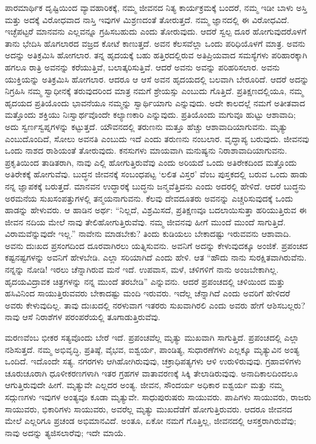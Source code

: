 ಪಾರಮಾರ್ಥಿಕ ದೃಷ್ಟಿಯಿಂದ ವ್ಯಾವಹಾರಿಕಕ್ಕೆ, ನಮ್ಮ ಜೀವನದ ನಿತ್ಯ ಕಾರ್ಯಕ್ರಮಕ್ಕೆ ಬಂದರೆ, ನಮ್ಮ ಇಡೀ ಬಾಳು ಅಸ್ತಿ ಮತ್ತು ಅದಕ್ಕೆ ವಿರೋಧವಾದ ನಾಸ್ತಿ ಇವುಗಳ ಮಿಶ್ರಣದಂತೆ ತೋರುತ್ತದೆ. ನಮ್ಮ ಜ್ಞಾನದಲ್ಲಿ ಈ ವಿರೋಧವಿದೆ. ಇಚ್ಛೆಪಟ್ಟರೆ ಮಾನವನು ಎಲ್ಲವನ್ನೂ ಗ್ರಹಿಸಬಹುದು ಎಂದು ತೋರುವುದು. ಆದರೆ ಸ್ವಲ್ಪ ದೂರ ಹೋಗುವುದರೊಳಗೆ ತಾನು ಭೇದಿಸಿ ಹೊಗಲಾರದ ವಜ್ರದ ಕೋಟೆ ಕಾಣುತ್ತದೆ. ಅವನ ಕೆಲಸವೆಲ್ಲಾ ಒಂದು ಪರಿಧಿಯೊಳಗೆ ಮಾತ್ರ. ಅವನು ಅದನ್ನು ಅತಿಕ್ರಮಿಸಿ ಹೋಗಲಾರ. ತನ್ನ ಹೃದಯಕ್ಕೆ ಬಹು ಹತ್ತಿರದಲ್ಲಿರುವ ಅತಿಪ್ರಿಯವಾದ ಸಮಸ್ಯೆಗಳು ಪರಿಹಾರಕ್ಕಾಗಿ ಹಗಲೂ ರಾತ್ರಿ ಅವನನ್ನು ಕರೆಯುತ್ತಿವೆ, ಬಲಾತ್ಕರಿಸುತ್ತಿವೆ. ಆದರೆ ಅವನು ಅವನ್ನು ಪರಿಹರಿಸಲಾರ. ಅವನು ಯುಕ್ತಿಯನ್ನು ಅತಿಕ್ರಮಿಸಿ ಹೋಗಲಾರ. ಆದರೂ ಆ ಆಸೆ ಅವನ ಹೃದಯದಲ್ಲಿ ಬಲವಾಗಿ ಬೇರೂರಿದೆ. ಆದರೆ ಅದನ್ನು ನಿಗ್ರಹಿಸಿ ನಮ್ಮ ಸ್ವಾಧೀನಕ್ಕೆ ತರುವುದರಿಂದ ಮಾತ್ರ ನಮಗೆ ಶ್ರೇಯಸ್ಸು ಎಂಬುದು ಗೊತ್ತಿದೆ. ಪ್ರತಿಕ್ಷಣದಲ್ಲಿಯೂ, ನಮ್ಮ ಹೃದಯದ ಪ್ರತಿಯೊಂದು ಭಾವನೆಯೂ ನಮ್ಮನ್ನು ಸ್ವಾರ್ಥಿಯಾಗು ಎನ್ನುವುದು. ಅದೇ ಕಾಲದಲ್ಲೆ ನಮಗೆ ಅತೀತವಾದ ಮತ್ತೊಂದು ಶಕ್ತಿಯು ನಿಃಸ್ವಾರ್ಥವೊಂದೇ ಕಲ್ಯಾಣಕಾರಿ ಎನ್ನುವುದು. ಪ್ರತಿಯೊಂದು ಮಗುವೂ ಹುಟ್ಟು ಆಶಾವಾದಿ; ಅದು ಸ್ವರ್ಣಸ್ವಪ್ನಗಳನ್ನು ಕಟ್ಟುತ್ತದೆ. ಯೌವನದಲ್ಲಿ ತರುಣನು ಮತ್ತೂ ಹೆಚ್ಚು ಆಶಾವಾದಿಯಾಗುವನು. ಮೃತ್ಯು ಎಂಬುದೊಂದಿದೆ, ಸೋಲು ಅವನತಿ ಎಂಬುದು ಇದೆ ಎಂದು ತರುಣನು ನಂಬಲಾರ. ವೃದ್ಧಾಪ್ಯ ಬರುವುದು. ಜೀವನವು ಒಂದು ನಾಶದ ರಾಶಿಯಂತೆ ತೋರುವುದು. ಕನಸುಗಳು ಮಾಯವಾಗಿ ಮನುಷ್ಯನು ನಿರಾಶಾವಾದಿಯಾಗುವನು. ಪ್ರಕೃತಿಯಿಂದ ತಾಡಿತರಾಗಿ, ನಾವು ಎಲ್ಲಿ ಹೋಗುತ್ತಿರುವೆವು ಎಂದು ಅರಿಯದೆ ಒಂದು ಅತಿರೇಕದಿಂದ ಮತ್ತೊಂದು ಅತಿರೇಕಕ್ಕೆ ಹೋಗುವೆವು. ಬುದ್ಧನ ಜೀವನಕ್ಕೆ ಸಂಬಂಧಪಟ್ಟ ‘ಲಲಿತ ವಿಸ್ತರ’ ವೆಂಬ ಪುಸ್ತಕದಲ್ಲಿ ಬರುವ ಒಂದು ಹಾಡು ನನ್ನ ಜ್ಞಾಪಕಕ್ಕೆ ಬರುತ್ತದೆ. ಮಾನವನ ಉದ್ಧಾರಕ್ಕೆ ಬುದ್ಧನು ಜನ್ಮವೆತ್ತಿದನು ಎಂದು ಅದರಲ್ಲಿ ಹೇಳಿದೆ. ಆದರೆ ಬುದ್ಧನು ಅರಮನೆಯ ಸುಖಸಂಪತ್ತುಗಳಲ್ಲಿ ತನ್ಮಯನಾಗುವನು. ಕೆಲವು ದೇವದೂತರು ಅವನನ್ನು ಎಚ್ಚರಿಸುವುದಕ್ಕೆ ಒಂದು ಹಾಡನ್ನು ಹೇಳುವರು. ಆ ಹಾಡಿನ ಅರ್ಥ: “ನಿಲ್ಲದೆ, ವಿಶ್ರಮಿಸದೆ, ಪ್ರತಿಕ್ಷಣವೂ ಬದಲಾಯಿಸುತ್ತಾ ಹರಿಯುತ್ತಿರುವ ಈ ಜೀವನ ನದಿಯ ಮೇಲೆ ನಾವು ತೇಲಿಹೋಗುತ್ತಿರುವೆವು. ನಮ್ಮ ಜೀವನವು ಹೀಗೆ ಮುಂದೆ ಮುಂದೆ ಸಾಗುತ್ತಿದೆ. ವಿರಾಮವೆನ್ನುವುದೇ ಇಲ್ಲ.” ನಾವೇನು ಮಾಡಬೇಕು? ತಿಂದು ಕುಡಿಯಲು ಬೇಕಾದಷ್ಟು ಇರುವವನು ಆಶಾವಾದಿ. ಅವನು ದುಃಖದ ಪ್ರಸಂಗದಿಂದ ದೂರವಾಗಿರಲು ಯತ್ನಿಸುವನು. ಅವನಿಗೆ ಅದನ್ನು ಕೇಳುವುದಕ್ಕೂ ಅಂಜಿಕೆ. ಪ್ರಪಂಚದ ಕಷ್ಟನಷ್ಟಗಳನ್ನು ಅವನಿಗೆ ಹೇಳಬೇಡಿ. ಎಲ್ಲಾ ಸರಿಯಾಗಿದೆ ಎಂದು ಹೇಳಿ. ಆತ “ಹೌದು ನಾನು ಸುರಕ್ಷಿತವಾಗಿರುವೆನು. ನನ್ನನ್ನು ನೋಡಿ! ಇರಲು ಚೆನ್ನಾಗಿರುವ ಮನೆ ಇದೆ. ಉಪವಾಸ, ಮಳೆ, ಚಳಿಗಳಿಗೆ ನಾನು ಅಂಜಬೇಕಾಗಿಲ್ಲ. ಹೃದಯವಿದ್ರಾವಕ ಚಿತ್ರಗಳನ್ನು ನನ್ನ ಮುಂದೆ ತರಬೇಡಿ” ಎನ್ನುವನು. ಆದರೆ ಪ್ರಪಂಚದಲ್ಲಿ ಚಳಿಯಿಂದ ಮತ್ತು ಹಸಿವಿನಿಂದ ಸಾಯುತ್ತಿರುವವರು ಬೇಕಾದಷ್ಟು ಮಂದಿ ಇರುವರು. ಇದೆಲ್ಲ ಚೆನ್ನಾಗಿದೆ ಎಂದು ಅವರಿಗೆ ಹೇಳಿದರೆ ಅವರು ಕೇಳುವುದಿಲ್ಲ. ತಾವು ದುಃಖದಲ್ಲಿ ನರಳುವಾಗ ಇತರರು ಸುಖವಾಗಿರಲಿ ಎಂದು ಅವರು ಹೇಗೆ ಆಶಿಸಬಲ್ಲರು? ನಾವು ಆಸೆ ನಿರಾಶೆಗಳ ಪರಂಪರೆಯಲ್ಲಿ ತೂಗಾಡುತ್ತಿರುವೆವು.

\vskip 0.2cm

ಮರಣವೆಂಬ ಭೀಕರ ಸತ್ಯವೊಂದು ಬೇರೆ ಇದೆ. ಪ್ರಪಂಚವೆಲ್ಲ ಮೃತ್ಯು ಮುಖವಾಗಿ ಸಾಗುತ್ತಿದೆ. ಪ್ರಪಂಚದಲ್ಲಿ ಎಲ್ಲಾ ನಶಿಸುತ್ತದೆ. ನಮ್ಮ ಅಭಿವೃದ್ಧಿ, ಪ್ರತಿಷ್ಠೆ, ವೈಭವ, ಐಶ್ವರ್ಯ, ಪಾಂಡಿತ್ಯ, ಸುಧಾರಣೆಗಳು ಎಲ್ಲಕ್ಕೂ ಮೃತ್ಯುವಿನ ಅಂತ್ಯ ಒಂದಿದೆ. ಇದೊಂದೇ ಸತ್ಯ. ನಗರಗಳು ಆಗಿಹೋಗಿರುವುವು, ಚಕ್ರಾಧಿಪತ್ಯಗಳು ಆಳಿ ಉರುಳಿರುವುವು. ಗ್ರಹಾವಳಿಗಳು ಚೂರುಚೂರಾಗಿ ಧೂಳೀಕರಣಗಳಾಗಿ ಇತರ ಗ್ರಹಗಳ ವಾತಾವರಣಕ್ಕೆ ಸಿಕ್ಕಿ ತೇಲಾಡಿರುವುವು. ಅನಾದಿಕಾಲದಿಂದಲೂ ಆಗುತ್ತಿರುವುದೇ ಹೀಗೆ. ಮೃತ್ಯುವೇ ಎಲ್ಲದರ ಅಂತ್ಯ. ಜೀವನ, ಸೌಂದರ್ಯ ಅಧಿಕಾರ ಐಶ್ವರ್ಯ ಮತ್ತು ನಮ್ಮ ಸದ್ಗುಣಗಳು ಇವುಗಳ ಅಂತ್ಯವೂ ಕೂಡಾ ಮೃತ್ಯುವೇ. ಸಾಧುಪುರುಷರು ಸಾಯುವರು. ಪಾಪಿಗಳು ಸಾಯುವರು, ರಾಜರು ಸಾಯುವರು, ಭಿಕಾರಿಗಳು ಸಾಯುವರು, ಅವರೆಲ್ಲ ಮೃತ್ಯು ಮುಖದೆಡೆಗೆ ಹೋಗುತ್ತಿರುವರು. ಆದರೂ ಜೀವನದ ಮೇಲೆ ಎಲ್ಲರಿಗೂ ಪ್ರಚಂಡ ಅಭಿಮಾನವಿದೆ. ಅಂತೂ, ಏಕೋ ನಮಗೆ ಗೊತ್ತಿಲ್ಲ, ಜೀವನದಲ್ಲಿ ಆಸಕ್ತರಾಗಿರುವೆವು; ನಾವು ಅದನ್ನು ತ್ಯಜಿಸಲಾರೆವು; ಇದೇ ಮಾಯೆ.

